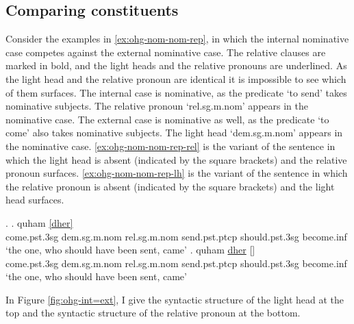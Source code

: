 \subsection{Comparing constituents}\label{sec:comparing-ohg}

Consider the examples in \ref{ex:ohg-nom-nom-rep}, in which the internal nominative case competes against the external nominative case. The relative clauses are marked in bold, and the light heads and the relative pronouns are underlined. As the light head and the relative pronoun are identical it is impossible to see which of them surfaces.
The internal case is nominative, as the predicate  `to send' takes nominative subjects. The relative pronoun  `\ac{rel}.\ac{sg}.\ac{m}.\ac{nom}' appears in the nominative case.
The external case is nominative as well, as the predicate  `to come' also takes nominative subjects. The light head  `\ac{dem}.\ac{sg}.\ac{m}.\ac{nom}' appears in the nominative case.
\ref{ex:ohg-nom-nom-rep-rel} is the variant of the sentence in which the light head is absent (indicated by the square brackets) and the relative pronoun surfaces.
\ref{ex:ohg-nom-nom-rep-lh} is the variant of the sentence in which the relative pronoun is absent (indicated by the square brackets) and the light head surfaces.

\ex.\label{ex:ohg-nom-nom-rep}
\ag. quham \underline{[dher]}  \underline{}  \\
 come.\ac{pst}.3\ac{sg}\scsub{[nom]} \ac{dem}.\ac{sg}.\ac{m}.\ac{nom} \ac{rel}.\ac{sg}.\ac{m}.\ac{nom} send.\ac{pst}.\ac{ptcp}\scsub{[nom]} should.\ac{pst}.3\ac{sg} become.\ac{inf}\\
 `the one, who should have been sent, came' \label{ex:ohg-nom-nom-rep-rel}
\bg. quham \underline{dher} [] \underline{}  \\
 come.\ac{pst}.3\ac{sg}\scsub{[nom]} \ac{dem}.\ac{sg}.\ac{m}.\ac{nom} \ac{rel}.\ac{sg}.\ac{m}.\ac{nom} send.\ac{pst}.\ac{ptcp}\scsub{[nom]} should.\ac{pst}.3\ac{sg} become.\ac{inf}\\
 `the one, who should have been sent, came' \label{ex:ohg-nom-nom-rep-lh}

In Figure \ref{fig:ohg-int=ext}, I give the syntactic structure of the light head at the top and the syntactic structure of the relative pronoun at the bottom.

